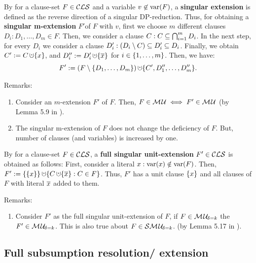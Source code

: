 \documentclass{report}
\begin{document}
\begin{defi}\label{def:singularextn}
By \cite{KullmannZhao2010Extremal} for a clause-set $F \in\mathcal{CLS}$ and a variable $v \not \in \operatorname{var}(F)$, a \textbf{singular extension} is defined as the reverse direction of a singular DP-reduction. Thus, for obtaining a \textbf{singular m-extension} $F' $of $F$ with $v$, first we choose $m$ different clauses $D_i:D_1, \dots, D_m \in F$. Then, we consider a clause  $C: C \subseteq \bigcap_{i=1}^m D_i$. In the next step, for every $D_i$ we consider a clause $D_i':(D_i \setminus C) \subseteq D_i' \subseteq D_i$. Finally, we obtain $C' := C \addcup \set{x}$, and $D_i'' := D_i' \addcup \set{\ol{x}}$ for $i \in \{ 1, \dots, m \}$. Then, we have:
  \begin{displaymath}
    F' := (F \sm \set{D_1,\dots,D_m}) \addcup \set{C', D_1'',\dots,D_m''}.
  \end{displaymath}
\end{defi}
Remarks:
  \begin{enumerate}
  \item Consider an $m$-extension $F'$ of $F$. Then, $F \in \mathcal{M\hspace{0.8pt}U} \iff F' \in \mathcal{M\hspace{0.8pt}U}$ (by Lemma 5.9 in \cite{KullmannZhao2010Extremal}).
  \item The singular m-extension of $F$ does not change the deficiency of $F$. But, number of clauses (and variables) is increased by one.
  \end{enumerate}
  
\begin{defi}\label{def:unit-ext}
By \cite{KullmannZhao2010Extremal} for a clause-set $F \in \mathcal{CLS}$, a \textbf{full singular unit-extension} $F' \in \mathcal{CLS}$ is obtained as follows: First, consider a literal $x:\operatorname{var}(x) \notin \operatorname{var}(F)$. Then, $F' := \set{\set{x}} \addcup \set{C \addcup \set{\ol{x}} : C \in F}$. Thus, $F' $ has a unit clause $\{ x \}$ and all clauses of $F$ with literal $\overline{x}$ added to them.
\end{defi}
Remarks:
  \begin{enumerate}
  \item Consider $F'$ as the full singular unit-extension of $F$, if $F \in \mathcal{M\hspace{0.8pt}U}_{\!\delta=k} $ the  $F' \in \mathcal{M\hspace{0.8pt}U}_{\!\delta=k} $. This is also true about $F \in \mathcal{S}\mathcal{M\hspace{0.8pt}U}_{\!\delta=k}$. (by Lemma 5.17 in \cite{KullmannZhao2010Extremal}).
  \end{enumerate}
\subsection{Full subsumption resolution/ extension}
\label{sec:fsr-e}  
\end{document}
